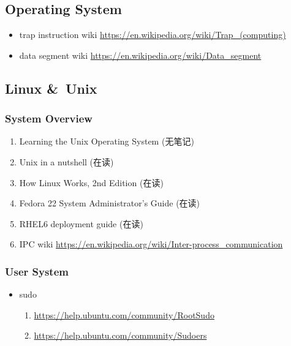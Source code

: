 \documentclass{article}
\begin{document}
\subsection{Operating System}
%
\begin{itemize}
    \item trap instruction wiki \url{https://en.wikipedia.org/wiki/Trap_(computing)}
    \item data segment wiki \url{https://en.wikipedia.org/wiki/Data_segment}
\end{itemize}
\subsection{Linux \&\ Unix}
\subsubsection{System Overview}
\begin{enumerate}
    \item Learning the Unix Operating System (无笔记)
    \item Unix in a nutshell (在读)
    \item How Linux Works, 2nd Edition (在读)
    \item Fedora 22 System Administrator's Guide (在读)
    \item RHEL6 deployment guide (在读)
    \item IPC wiki \url{https://en.wikipedia.org/wiki/Inter-process_communication}
\end{enumerate}
%
\subsubsection{User System}
%
\begin{itemize}
    \item sudo
        \begin{enumerate}
            \item \url{https://help.ubuntu.com/community/RootSudo}
            \item \url{https://help.ubuntu.com/community/Sudoers}
        \end{enumerate}
\end{itemize}
%
\end{document}
